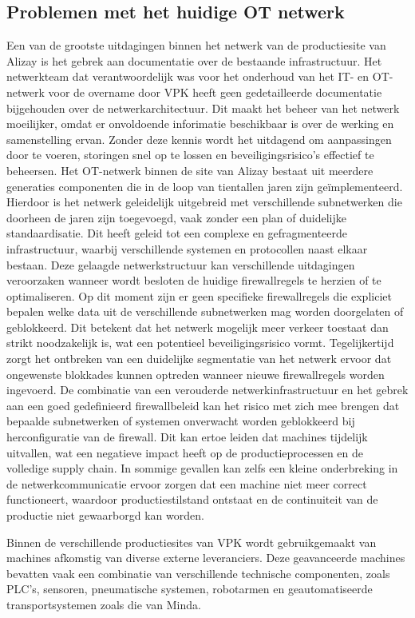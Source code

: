 \subsection{Problemen met het huidige OT netwerk}
Een van de grootste uitdagingen binnen het netwerk van de productiesite van Alizay is het gebrek aan documentatie over de bestaande infrastructuur. Het netwerkteam dat verantwoordelijk was voor het onderhoud van het IT- en OT-netwerk voor de overname door VPK heeft geen gedetailleerde documentatie bijgehouden over de netwerkarchitectuur. Dit maakt het beheer van het netwerk moeilijker, omdat er onvoldoende inforimatie beschikbaar is over de werking en samenstelling ervan. Zonder deze kennis wordt het uitdagend om aanpassingen door te voeren, storingen snel op te lossen en beveiligingsrisico’s effectief te beheersen.
Het OT-netwerk binnen de site van Alizay bestaat uit meerdere generaties componenten die in de loop van tientallen jaren zijn geïmplementeerd. Hierdoor is het netwerk geleidelijk uitgebreid met verschillende subnetwerken die doorheen de jaren zijn toegevoegd, vaak zonder een plan of duidelijke standaardisatie. Dit heeft geleid tot een complexe en gefragmenteerde infrastructuur, waarbij verschillende systemen en protocollen naast elkaar bestaan.
Deze gelaagde netwerkstructuur kan verschillende uitdagingen veroorzaken wanneer wordt besloten de huidige firewallregels te herzien of te optimaliseren. Op dit moment zijn er geen specifieke firewallregels die expliciet bepalen welke data uit de verschillende subnetwerken mag worden doorgelaten of geblokkeerd. Dit betekent dat het netwerk mogelijk meer verkeer toestaat dan strikt noodzakelijk is, wat een potentieel beveiligingsrisico vormt. Tegelijkertijd zorgt het ontbreken van een duidelijke segmentatie van het netwerk ervoor dat ongewenste blokkades kunnen optreden wanneer nieuwe firewallregels worden ingevoerd.
De combinatie van een verouderde netwerkinfrastructuur en het gebrek aan een goed gedefinieerd firewallbeleid kan het risico met zich mee brengen dat bepaalde subnetwerken of systemen onverwacht worden geblokkeerd bij herconfiguratie van de firewall. Dit kan ertoe leiden dat machines tijdelijk uitvallen, wat een negatieve impact heeft op de productieprocessen en de volledige supply chain. In sommige gevallen kan zelfs een kleine onderbreking in de netwerkcommunicatie ervoor zorgen dat een machine niet meer correct functioneert, waardoor productiestilstand ontstaat en de continuiteit van de productie niet gewaarborgd kan worden.

Binnen de verschillende productiesites van VPK wordt gebruikgemaakt van machines afkomstig van diverse externe leveranciers. Deze geavanceerde machines bevatten vaak een combinatie van verschillende technische componenten, zoals PLC’s, sensoren, pneumatische systemen, robotarmen en geautomatiseerde transportsystemen zoals die van Minda. 

